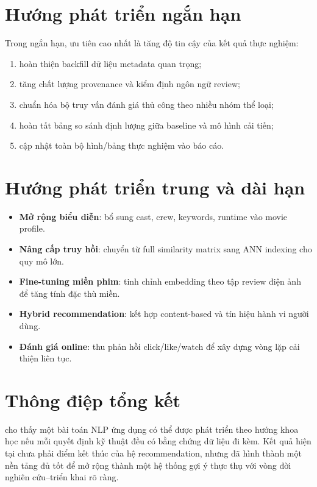 \section{Hướng phát triển ngắn hạn}
Trong ngắn hạn, ưu tiên cao nhất là tăng độ tin cậy của kết quả thực nghiệm:
\begin{enumerate}[label=\arabic*.]
    \item hoàn thiện backfill dữ liệu metadata quan trọng;
    \item tăng chất lượng provenance và kiểm định ngôn ngữ review;
    \item chuẩn hóa bộ truy vấn đánh giá thủ công theo nhiều nhóm thể loại;
    \item hoàn tất bảng so sánh định lượng giữa baseline và mô hình cải tiến;
    \item cập nhật toàn bộ hình/bảng thực nghiệm vào báo cáo.
\end{enumerate}

\section{Hướng phát triển trung và dài hạn}
\begin{itemize}
    \item \textbf{Mở rộng biểu diễn}: bổ sung cast, crew, keywords, runtime vào movie profile.
    \item \textbf{Nâng cấp truy hồi}: chuyển từ full similarity matrix sang ANN indexing cho quy mô lớn.
    \item \textbf{Fine-tuning miền phim}: tinh chỉnh embedding theo tập review điện ảnh để tăng tính đặc thù miền.
    \item \textbf{Hybrid recommendation}: kết hợp content-based và tín hiệu hành vi người dùng.
    \item \textbf{Đánh giá online}: thu phản hồi click/like/watch để xây dựng vòng lặp cải thiện liên tục.
\end{itemize}

\section{Thông điệp tổng kết}
\ProjectName{} cho thấy một bài toán NLP ứng dụng có thể được phát triển theo hướng khoa học nếu mỗi quyết định kỹ thuật đều có bằng chứng dữ liệu đi kèm. Kết quả hiện tại chưa phải điểm kết thúc của hệ recommendation, nhưng đã hình thành một nền tảng đủ tốt để mở rộng thành một hệ thống gợi ý thực thụ với vòng đời nghiên cứu--triển khai rõ ràng.
